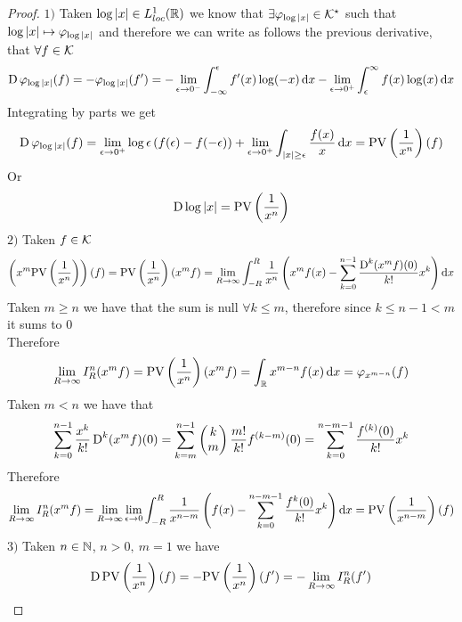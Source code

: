 \documentclass[../complete.tex]{subfiles}
\begin{document}
\begin{proof}
	$1)$ Taken $\log\abs{x}\in L^1_{loc}(\R)$ we know that $\exists\varphi_{\log\abs{x}}\in\K^\star$ such that $\log\abs{x}\mapsto\varphi_{\log\abs{x}}$ and therefore we can write as follows the previous derivative, that $\forall f\in\K$
	\begin{equation*}
		\D\varphi_{\log\abs{x}}(f)=-\varphi_{\log\abs{x}}(f')=-\lim_{\epsilon\to0^-}\int_{-\infty}^{\epsilon}f'(x)\log(-x)\diff x-\lim_{\epsilon\to0^+}\int_{\epsilon}^{\infty}f(x)\log(x)\diff x
	\end{equation*}
	Integrating by parts we get
	\begin{equation*}
		\D\varphi_{\log\abs{x}}(f)=\lim_{\epsilon\to0^+}\log\epsilon\left( f(\epsilon)-f(-\epsilon) \right)+\lim_{\epsilon\to0^+}\int_{\abs{x}\ge\epsilon}^{}\frac{f(x)}{x}\diff x=\cpvdist(f)
	\end{equation*}
	Or
	\begin{equation*}
		\D\log\abs{x}=\cpvdist
	\end{equation*}
	$2)$ Taken $f\in\K$
	\begin{equation*}
		\left( x^m\cpvdist \right)(f)=\cpvdist(x^mf)=\lim_{R\to\infty}\int_{-R}^{R}\frac{1}{x^n}\left( x^mf(x)-\sum_{k=0}^{n-1}\frac{\D^k(x^mf)(0)}{k!}x^k \right)\diff x
	\end{equation*}
	Taken $m\ge n$ we have that the sum is null $\forall k\le m$, therefore since $k\le n-1<m$ it sums to $0$\\
	Therefore
	\begin{equation*}
		\lim_{R\to\infty}I_R^n(x^mf)=\cpvdist(x^mf)=\int_{\R}^{}x^{m-n}f(x)\diff x=\varphi_{x^{m-n}}(f)
	\end{equation*}
	Taken $m<n$ we have that
	\begin{equation*}
		\sum_{k=0}^{n-1}\frac{x^k}{k!}\D^k(x^mf)(0)=\sum_{k=m}^{n-1}\begin{pmatrix}k\\m\end{pmatrix}\frac{m!}{k!}f^{(k-m)}(0)=\sum_{k=0}^{n-m-1}\frac{f^{(k)}(0)}{k!}x^k
	\end{equation*}
	Therefore
	\begin{equation*}
		\lim_{R\to\infty}I_R^n(x^mf)=\lim_{R\to\infty}\lim_{\epsilon\to0}\int_{-R}^{R}\frac{1}{x^{n-m}}\left( f(x)-\sum_{k=0}^{n-m-1}\frac{f^{k}(0)}{k!}x^k \right)\diff x=\cpvdist[n-m](f)
	\end{equation*}
	$3)$ Taken $n\in\N$, $n>0,\ m=1$ we have
	\begin{equation*}
		\D\cpvdist(f)=-\cpvdist(f')=-\lim_{R\to\infty}I_R^n(f')

\end{equation*}
\end{proof}
\end{document}

